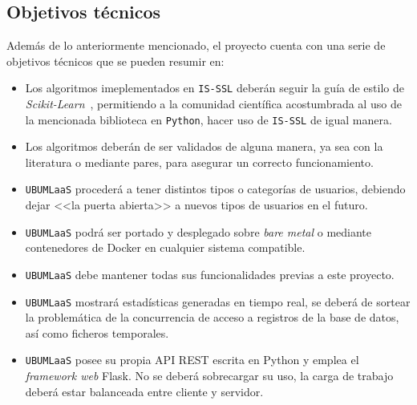\subsection{Objetivos técnicos}
Además de lo anteriormente mencionado, el proyecto cuenta con una serie de objetivos técnicos que se pueden resumir en:
\begin{itemize}
\item Los algoritmos imeplementados en \texttt{IS-SSL} deberán seguir la guía de estilo de \textit{Scikit-Learn}~\cite{SKLEARNGUIDELINES}, permitiendo a la comunidad científica acostumbrada al uso de la mencionada biblioteca en \texttt{Python}, hacer uso de \texttt{IS-SSL} de igual manera.
\item Los algoritmos deberán de ser validados de alguna manera, ya sea con la literatura o mediante pares, para asegurar un correcto funcionamiento. 
\item \texttt{UBUMLaaS} procederá a tener distintos tipos o categorías de usuarios, debiendo dejar <<la puerta abierta>> a nuevos tipos de usuarios en el futuro.
\item \texttt{UBUMLaaS} podrá ser portado y desplegado sobre  \textit{bare metal} o mediante contenedores de Docker en cualquier sistema compatible.
\item \texttt{UBUMLaaS} debe mantener todas sus funcionalidades previas a este proyecto.
\item \texttt{UBUMLaaS} mostrará estadísticas generadas en tiempo real, se deberá de sortear la problemática de la concurrencia de acceso a registros de la base de datos, así como ficheros temporales.
\item \texttt{UBUMLaaS} posee su propia API REST escrita en Python y emplea el \textit{framework web} Flask. No se deberá sobrecargar su uso, la carga de trabajo deberá estar balanceada entre cliente y servidor.
\end{itemize}